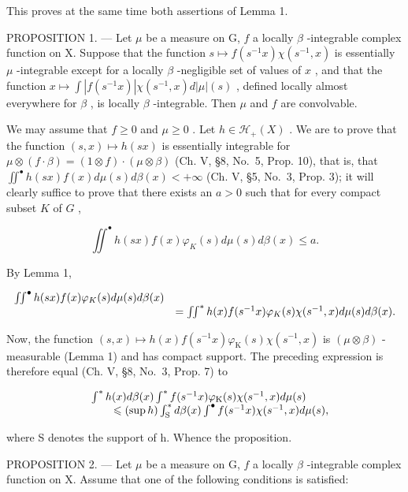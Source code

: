 This proves at the same time both assertions of Lemma 1.

PROPOSITION 1. --- Let \(\mu\) be a measure on G, \(f\) a locally \(\beta\) -integrable complex function on X. Suppose that the function \(s \mapsto f(s^{-1}x)\chi(s^{-1}, x)\) is essentially \(\mu\) -integrable except for a locally \(\beta\) -negligible set of values of \(x\) , and that the function \(x \mapsto \int |f(s^{-1}x)| \chi(s^{-1}, x) d|\mu|(s)\) , defined locally almost everywhere for \(\beta\) , is locally \(\beta\) -integrable. Then \(\mu\) and \(f\) are convolvable.

We may assume that \(f \geqslant 0\) and \(\mu \geqslant 0\) . Let \(h \in \mathcal{H}_{+}(X)\) . We are to prove that the function \((s, x) \mapsto h(sx)\) is essentially integrable for \(\mu \otimes (f \cdot \beta) = (1 \otimes f) \cdot (\mu \otimes \beta)\) (Ch. V, §8, No.~5, Prop. 10), that is, that \(\iint^{\bullet} h(sx)f(x)d\mu(s)d\beta(x) < +\infty\) (Ch. V, §5, No.~3, Prop. 3); it will clearly suffice to prove that there exists an \(a > 0\) such that for every compact subset \(K\) of \(G\) ,

\[
\iint^ {\bullet} h (s x) f (x) \varphi_ {K} (s) d \mu (s) d \beta (x) \leqslant a.
\]

By Lemma 1,

\[
\begin{array}{r l} \iint^ {\bullet} h (s x) f (x) \varphi_ {K} (s) d \mu (s) d \beta (x) \\ & = \iint^ {*} h (x) f (s ^ {- 1} x) \varphi_ {K} (s) \chi (s ^ {- 1}, x) d \mu (s) d \beta (x). \end{array}
\]

Now, the function \((s,x)\mapsto h(x)f(s^{-1}x)\varphi_{\mathrm{K}}(s)\chi(s^{-1},x)\) is \((\mu\otimes\beta)\) -measurable (Lemma 1) and has compact support. The preceding expression is therefore equal (Ch. V, §8, No.~3, Prop. 7) to

\[
\begin{array}{r l} & {\int^ {*} h (x) d \beta (x) \int^ {*} f (s ^ {- 1} x) \varphi_ {\mathrm{K}} (s) \chi (s ^ {- 1}, x) d \mu (s)} \\ & {\qquad \leqslant (\sup h) \int_ {\mathrm{S}} ^ {*} d \beta (x) \int^ {\bullet} f (s ^ {- 1} x) \chi (s ^ {- 1}, x) d \mu (s),} \end{array}
\]

where S denotes the support of h. Whence the proposition.

PROPOSITION 2. --- Let \(\mu\) be a measure on G, \(f\) a locally \(\beta\) -integrable complex function on X. Assume that one of the following conditions is satisfied:

